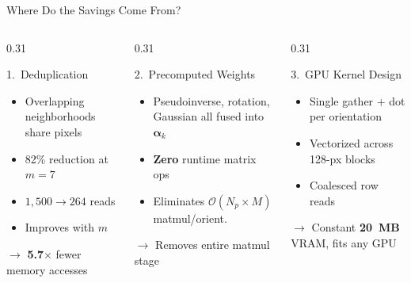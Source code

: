 \documentclass[10pt, aspectratio=169]{beamer}
\begin{document}
\begin{frame}{Where Do the Savings Come From?}
  \begin{columns}[T]
    \begin{column}{0.31\textwidth}
      \begin{block}{1.\ Deduplication}
        \begin{itemize}
          \item Overlapping neighborhoods share pixels
          \item 82\% reduction at $m{=}7$
          \item $1{,}500 \to 264$ reads
          \item Improves with $m$
        \end{itemize}
        \vspace{0.3em}
        $\to$ \textbf{5.7$\times$} fewer memory accesses
      \end{block}
    \end{column}
    \begin{column}{0.31\textwidth}
      \begin{block}{2.\ Precomputed Weights}
        \begin{itemize}
          \item Pseudoinverse, rotation, Gaussian all fused into $\boldsymbol{\alpha}_k$
          \item \textbf{Zero} runtime matrix ops
          \item Eliminates $\mathcal{O}(N_p {\times} M)$ matmul/orient.
        \end{itemize}
        \vspace{0.3em}
        $\to$ Removes entire matmul stage
      \end{block}
    \end{column}
    \begin{column}{0.31\textwidth}
      \begin{block}{3.\ GPU Kernel Design}
        \begin{itemize}
          \item Single gather + dot per orientation
          \item Vectorized across 128-px blocks
          \item Coalesced row reads
        \end{itemize}
        \vspace{0.3em}
        $\to$ Constant \textbf{20~MB} VRAM, fits any GPU
      \end{block}
    \end{column}
  \end{columns}
\end{frame}
\end{document}
